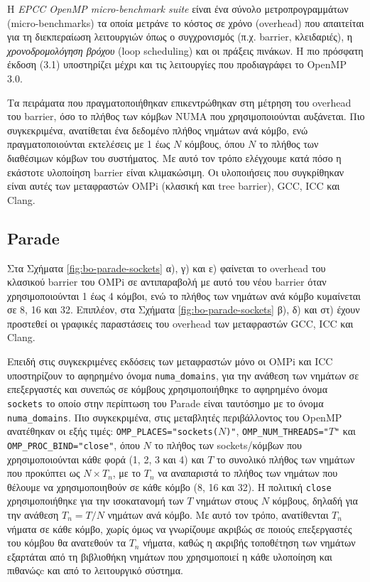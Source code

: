Η \textit{EPCC OpenMP micro-benchmark suite} \cite{bull1999measuring} είναι ένα σύνολο μετροπρογραμμάτων (micro-benchmarks) τα οποία μετράνε το κόστος σε χρόνο (overhead) που απαιτείται για τη διεκπεραίωση λειτουργιών όπως ο συγχρονισμός (π.χ. barrier, κλειδαριές), η \textit{χρονοδρομολόγηση βρόχου} (loop scheduling) και οι πράξεις πινάκων. Η πιο πρόσφατη έκδοση (3.1) υποστηρίζει μέχρι και τις λειτουργίες που προδιαγράφει το OpenMP 3.0.

Τα πειράματα που πραγματοποιήθηκαν επικεντρώθηκαν στη μέτρηση του overhead του barrier, όσο το πλήθος των κόμβων NUMA που χρησιμοποιούνται αυξάνεται. Πιο συγκεκριμένα, ανατίθεται ένα δεδομένο πλήθος νημάτων ανά κόμβο, ενώ πραγματοποιούνται εκτελέσεις με 1 έως $N$ κόμβους, όπου $N$ το πλήθος των διαθέσιμων κόμβων του συστήματος. Με αυτό τον τρόπο ελέγχουμε κατά πόσο η εκάστοτε υλοποίηση barrier είναι κλιμακώσιμη. Οι υλοποιήσεις που συγκρίθηκαν είναι αυτές των μεταφραστών OMPi (κλασική και tree barrier), GCC, ICC και Clang.


\subsection{Parade}
Στα Σχήματα \ref{fig:bo-parade-sockets} α), γ) και ε) φαίνεται το overhead του κλασικού barrier του OMPi σε αντιπαραβολή με αυτό του νέου barrier όταν χρησιμοποιούνται 1 έως 4 κόμβοι, ενώ το πλήθος των νημάτων ανά κόμβο κυμαίνεται σε 8, 16 και 32. Επιπλέον, στα Σχήματα \ref{fig:bo-parade-sockets} β), δ) και στ) έχουν προστεθεί οι γραφικές παραστάσεις του overhead των μεταφραστών GCC, ICC και Clang.

Επειδή στις συγκεκριμένες εκδόσεις των μεταφραστών μόνο οι OMPi και ICC υποστηρίζουν το αφηρημένο όνομα \texttt{numa\_domains}, για την ανάθεση των νημάτων σε επεξεργαστές και συνεπώς σε κόμβους χρησιμοποιήθηκε το αφηρημένο όνομα \texttt{sockets} το οποίο στην περίπτωση του Parade είναι ταυτόσημο με το όνομα \texttt{numa\_domains}. Πιο συγκεκριμένα, στις μεταβλητές περιβάλλοντος του OpenMP ανατέθηκαν οι εξής τιμές: \texttt{OMP\_PLACES="sockets($N$)"}, \texttt{OMP\_NUM\_THREADS="$T$"} και \texttt{OMP\_PROC\_BIND="close"}, όπου $N$ το πλήθος των sockets/κόμβων που χρησιμοποιούνται κάθε φορά (1, 2, 3 και 4) και $T$ το συνολικό πλήθος των νημάτων που προκύπτει ως $N \times T_n$, με το $T_n$ να αναπαριστά το πλήθος των νημάτων που θέλουμε να χρησιμοποιηθούν σε κάθε κόμβο (8, 16 και 32). Η πολιτική \texttt{close} χρησιμοποιήθηκε για την ισοκατανομή των $T$ νημάτων στους $N$ κόμβους, δηλαδή για την ανάθεση $T_n = T/N$ νημάτων ανά κόμβο. Με αυτό τον τρόπο, ανατίθενται $T_n$ νήματα σε κάθε κόμβο, χωρίς όμως να γνωρίζουμε ακριβώς σε ποιούς επεξεργαστές του κόμβου θα ανατεθούν τα $T_n$ νήματα, καθώς η ακριβής τοποθέτηση των νημάτων εξαρτάται από τη βιβλιοθήκη νημάτων που χρησιμοποιεί η κάθε υλοποίηση και πιθανώςc και από το λειτουργικό σύστημα.

